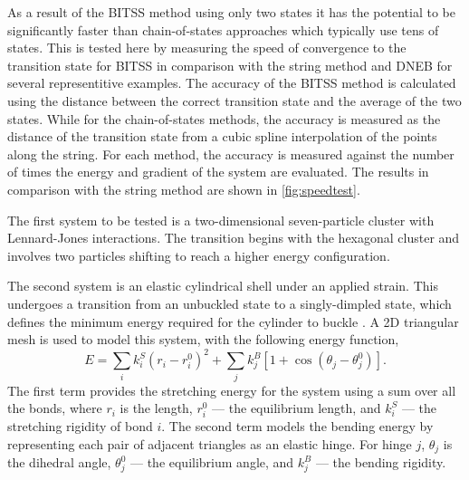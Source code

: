\documentclass[aps,prl,twocolumn,groupedaddress]{revtex4}
\begin{document}
\topic As a result of the BITSS method using only two states it has the potential to be significantly faster than chain-of-states approaches which typically use tens of states.
This is tested here by measuring the speed of convergence to the transition state for BITSS in comparison with the string method and DNEB for several representitive examples.
The accuracy of the BITSS method is calculated using the distance between the correct transition state and the average of the two states.
While for the chain-of-states methods, the accuracy is measured as the distance of the transition state from a cubic spline interpolation of the points along the string.
For each method, the accuracy is measured against the number of times the energy and gradient of the system are evaluated.
The results in comparison with the string method are shown in \cref{fig:speedtest}.

\topic The first system to be tested is a two-dimensional seven-particle cluster with Lennard-Jones interactions.
The transition begins with the hexagonal cluster and involves two particles shifting to reach a higher energy configuration.

\topic The second system is an elastic cylindrical shell under an applied strain.
This undergoes a transition from an unbuckled state to a singly-dimpled state, which defines the minimum energy required for the cylinder to buckle \cite{Panter2019}.
A 2D triangular mesh is used to model this system, with the following energy function,
\begin{equation}
  E = \sum_i k^S_i (r_i - r^0_i)^2 + \sum_j k^B_j [1 + \cos(\theta_j - \theta^0_j)].
\end{equation}
The first term provides the stretching energy for the system using a sum over all the bonds, where $r_i$ is the length, $r^0_i$ --- the equilibrium length, and $k^S_i$ --- the stretching rigidity of bond $i$.
The second term models the bending energy by representing each pair of adjacent triangles as an elastic hinge.
For hinge $j$, $\theta_j$ is the dihedral angle, $\theta^0_j$ --- the equilibrium angle, and $k^B_j$ --- the bending rigidity.
\end{document}

